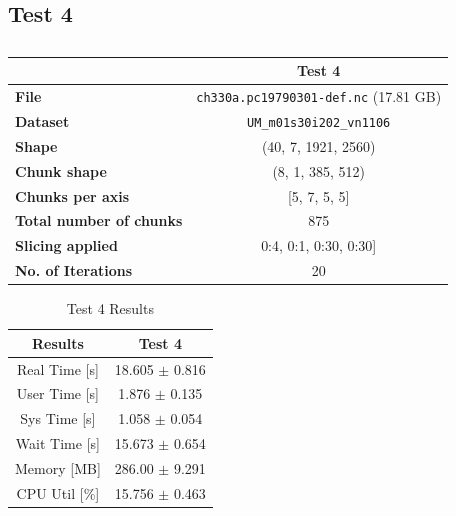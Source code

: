 \documentclass{article}
\begin{document}
\subsection{Test 4}
\begin{table}[h!] 
    \centering 
    \begin{tabular}{lc}  \hline
                                        & Test 4                                          \\ \hline
        \textbf{File}                   & \texttt{ch330a.pc19790301-def.nc} (17.81  GB)  \\  
        \textbf{Dataset}                & \texttt{UM\_m01s30i202\_vn1106}     \\ 
        \textbf{Shape}                  & (40, 7, 1921, 2560)                 \\ 
        \textbf{Chunk shape}            & (8, 1, 385, 512)                    \\ 
        \textbf{Chunks per axis}        & [5, 7, 5, 5]                        \\ 
        \textbf{Total number of chunks} & 875                                 \\ 
        \textbf{Slicing applied}        & 0:4, 0:1, 0:30, 0:30]               \\ 
        \textbf{No. of Iterations}      & 20                                  \\  \hline
    \end{tabular} 
    \caption{} 
    \label{tab:T4_Conditions} 
\end{table}


\begin{table}[h!]
    \centering
    \begin{tabular}{cc}
        \hline
        \textbf{Results} & Test 4               \\ \hline
        Real Time [s]    &  18.605 $\pm$ 0.816  \\
        User Time [s]    &  1.876 $\pm$ 0.135   \\
        Sys Time [s]     &  1.058 $\pm$ 0.054   \\
        Wait Time [s]    &  15.673 $\pm$ 0.654  \\
        Memory [MB]      &  286.00 $\pm$ 9.291  \\
        CPU Util [\%]    &  15.756 $\pm$ 0.463  \\
        \hline
    \end{tabular}
    \caption{Test 4 Results}
    \label{tab:T4_Results}
\end{table}
\end{document}
